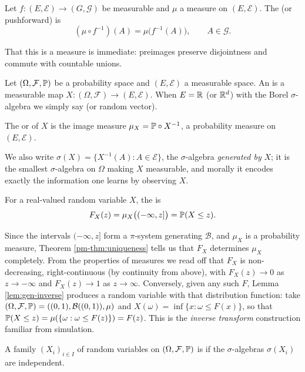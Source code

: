 \documentclass[a4paper]{scrartcl}
\newcommand{\cB}{\mathcal{B}}
\newcommand{\cE}{\mathcal{E}}
\newcommand{\cF}{\mathcal{F}}
\newcommand{\cG}{\mathcal{G}}
\begin{document}
\begin{definition}
	Let $f : (E,\cE) \to (G,\cG)$ be measurable and $\mu$ a measure on $(E,\cE)$. The  (or pushforward) is
	$$
	(\mu \circ f^{-1})(A) = \mu\big(f^{-1}(A)\big), \qquad A \in \cG.
	$$
\end{definition}

That this is a measure is immediate: preimages preserve disjointness and commute with countable unions.

\begin{definition}
	Let $(\Omega, \cF, \PP)$ be a probability space and $(E,\cE)$ a measurable space. An  is a measurable map $X : (\Omega, \cF) \to (E,\cE)$. When $E = \mathbb{R}$ (or $\mathbb{R}^d$) with the Borel $\sigma$-algebra we simply say  (or random vector).

	The  or  of $X$ is the image measure $\mu_X = \mathbb{P} \circ X^{-1}$, a probability measure on $(E,\cE)$.
\end{definition}

We also write $\sigma(X) = \{X^{-1}(A) : A \in \cE\}$, the $\sigma$-algebra \emph{generated by} $X$; it is the smallest $\sigma$-algebra on $\Omega$ making $X$ measurable, and morally it encodes exactly the information one learns by observing $X$.

\begin{definition}
	For a real-valued random variable $X$, the  is
	$$
	F_X(z) = \mu_X\big((-\infty,z]\big) = \mathbb{P}(X \leq z).
	$$
\end{definition}

Since the intervals $(-\infty,z]$ form a $\pi$-system generating $\cB$, and $\mu_X$ is a probability measure, Theorem \ref{pm-thm:uniqueness} tells us that $F_X$ determines $\mu_X$ completely. From the properties of measures we read off that $F_X$ is non-decreasing, right-continuous (by continuity from above), with $F_X(z) \to 0$ as $z \to -\infty$ and $F_X(z) \to 1$ as $z \to \infty$. Conversely, given any such $F$, Lemma \ref{lem:gen-inverse} produces a random variable with that distribution function: take $(\Omega,\cF,\PP) = ((0,1), \cB((0,1)), \mu)$ and $X(\omega) = \inf\{x : \omega \leq F(x)\}$, so that $\mathbb{P}(X \leq z) = \mu(\{\omega : \omega \leq F(z)\}) = F(z)$. This is the \emph{inverse transform} construction familiar from simulation.

\begin{definition}
	A family $(X_i)_{i \in I}$ of random variables on $(\Omega,\cF,\PP)$ is  if the $\sigma$-algebras $\sigma(X_i)$ are independent.
\end{definition}
\end{document}
